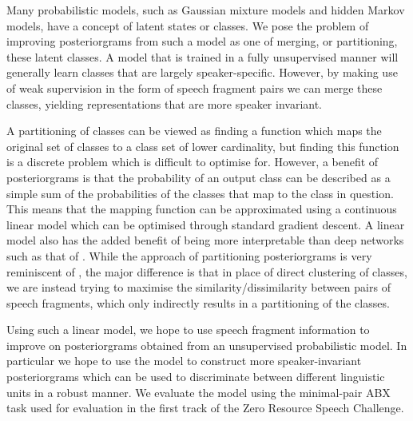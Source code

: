Many probabilistic models, such as Gaussian mixture models and hidden Markov models, have a concept of latent states or classes.
We pose the problem of improving posteriorgrams from such a model as one of merging, or partitioning, these latent classes.
A model that is trained in a fully unsupervised manner will generally learn classes that are largely speaker-specific.
However, by making use of weak supervision in the form of speech fragment pairs we can merge these classes, yielding representations that are more speaker invariant.

A partitioning of classes can be viewed as finding a function which maps the original set of classes to a class set of lower cardinality, but finding this function is a discrete problem which is difficult to optimise for.
However, a benefit of posteriorgrams is that the probability of an output class can be described as a simple sum of the probabilities of the classes that map to the class in question.
This means that the mapping function can be approximated using a continuous linear model which can be optimised through standard gradient descent.
A linear model also has the added benefit of being more interpretable than deep networks such as that of \textcite{thiolliere2015hybrid}.
While the approach of partitioning posteriorgrams is very reminiscent of \textcite{jansen2013weak}, the major difference is that in place of direct clustering of classes, we are instead trying to maximise the similarity/dissimilarity between pairs of speech fragments, which only indirectly results in a partitioning of the classes.

Using such a linear model, we hope to use speech fragment information to improve on posteriorgrams obtained from an unsupervised probabilistic model.
In particular we hope to use the model to construct more speaker-invariant posteriorgrams which can be used to discriminate between different linguistic units in a robust manner.
We evaluate the model using the minimal-pair ABX task used for evaluation in the first track of the Zero Resource Speech Challenge.
